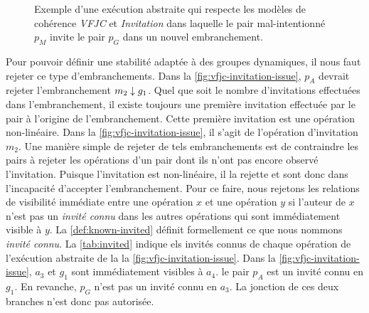 \begin{figure}[htb]
\centering
{}
\caption{Exemple  d'une exécution abstraite qui respecte les modèles de cohérence \emph{VFJC} et \emph{Invitation} dans laquelle le pair mal-intentionné $p_M$ invite le pair $p_G$ dans un nouvel embranchement.}\label{fig:vfjc-invitation-issue}
\end{figure}

Pour pouvoir définir une stabilité adaptée à des groupes dynamiques, il nous faut rejeter ce type d'embranchements.
Dans la \autoref{fig:vfjc-invitation-issue}, $p_A$ devrait rejeter l'embranchement $m_2 \downarrow g_1$.
Quel que soit le nombre d'invitations effectuées dans l'embranchement, il existe toujours une première invitation effectuée par le pair à l'origine de l'embranchement.
Cette première invitation est une opération non-linéaire.
Dans la \autoref{fig:vfjc-invitation-issue}, il s'agit de l'opération d'invitation $m_2$.
Une manière simple de rejeter de tels embranchements est de contraindre les pairs à rejeter les opérations d'un pair dont ils n'ont pas encore observé l'invitation.
Puisque l'invitation est non-linéaire, il la rejette et sont donc dans l'incapacité d'accepter l'embranchement.
Pour ce faire, nous rejetons les relations de visibilité immédiate entre une opération $x$ et une opération $y$ si l'auteur de $x$ n'est pas un \emph{invité connu} dans les autres opérations qui sont immédiatement visible à $y$.
La \autoref{def:known-invited} définit formellement ce que nous nommons \emph{invité connu}.
La \autoref{tab:invited} indique els invités connus de chaque opération de l'exécution abstraite de la la \autoref{fig:vfjc-invitation-issue}.
Dans la \autoref{fig:vfjc-invitation-issue}, $a_3$ et $g_1$ sont immédiatement visibles à $a_4$.
le pair $p_A$ est un invité connu en $g_1$.
En revanche, $p_G$ n'est pas un invité connu en $a_3$.
La jonction de ces deux branches n'est donc pas autorisée.

